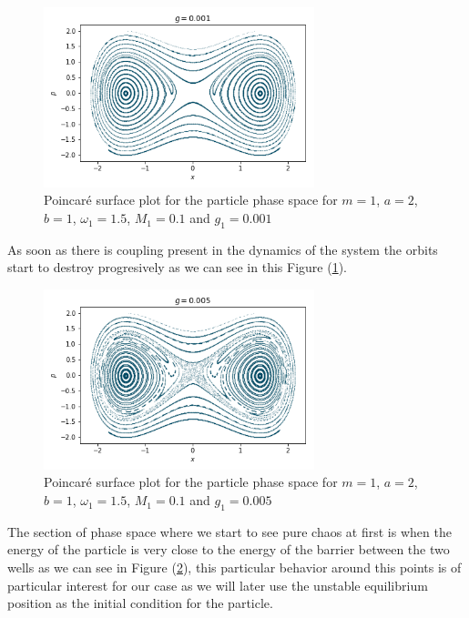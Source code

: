\begin{figure}[H]
\centering
\includegraphics[width=0.7\textwidth]{Figures/poincare_g0001.png}
\caption{Poincaré surface plot for the particle phase space for $m=1$, $a=2$, $b=1$, $\omega_1=1.5$, $M_1=0.1$ and $g_1=0.001$\label{fig:poinc_g0001}
}
\end{figure}

As soon as there is coupling present in the dynamics of the system the orbits start to destroy progresively as we can see in this Figure (\ref{fig:poinc_g0001}). 

\begin{figure}[H]
\centering
\includegraphics[width=0.7\textwidth]{Figures/poincare_g0005.png}
\caption{Poincaré surface plot for the particle phase space for $m=1$, $a=2$, $b=1$, $\omega_1=1.5$, $M_1=0.1$ and $g_1=0.005$\label{fig:poinc_g0005}
}
\end{figure}

The section of phase space where we start to see pure chaos at first is when the energy of the particle is very close to the energy of the barrier between the two wells as we can see in Figure (\ref{fig:poinc_g0005}), this particular behavior around this points is of particular interest for our case as we will later use the unstable equilibrium position as the initial condition for the particle.

